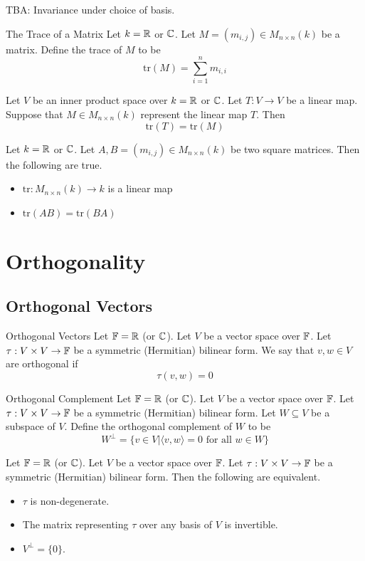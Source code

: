 \documentclass[a4paper]{article}
\begin{document}
TBA: Invariance under choice of basis. 

\begin{defn}{The Trace of a Matrix}{} Let $k=\mathbb{R}$ or $\mathbb{C}$. Let $M=(m_{i,j})\in M_{n\times n}(k)$ be a matrix. Define the trace of $M$ to be $$\text{tr}(M)=\sum_{i=1}^nm_{i,i}$$
\end{defn}

\begin{prp}{}{} Let $V$ be an inner product space over $k=\mathbb{R}$ or $\mathbb{C}$. Let $T:V\to V$ be a linear map. Suppose that $M\in M_{n\times n}(k)$ represent the linear map $T$. Then $$\text{tr}(T)=\text{tr}(M)$$
\end{prp}

\begin{lmm}{}{} Let $k=\mathbb{R}$ or $\mathbb{C}$. Let $A,B=(m_{i,j})\in M_{n\times n}(k)$ be two square matrices. Then the following are true. 
\begin{itemize}
\item $\text{tr}:M_{n\times n}(k)\to k$ is a linear map
\item $\text{tr}(AB)=\text{tr}(BA)$
\end{itemize}
\end{lmm}

\pagebreak
\section{Orthogonality}
\subsection{Orthogonal Vectors}
\begin{defn}{Orthogonal Vectors}{} Let $\mathbb{F}=\mathbb{R}$ (or $\mathbb{C}$). Let $V$ be a vector space over $\mathbb{F}$. Let $\tau:V\times V\to\mathbb{F}$ be a symmetric (Hermitian) bilinear form. We say that $v,w\in V$ are orthogonal if $$\tau(v,w)=0$$
\end{defn}

\begin{defn}{Orthogonal Complement}{} Let $\mathbb{F}=\mathbb{R}$ (or $\mathbb{C}$). Let $V$ be a vector space over $\mathbb{F}$. Let $\tau:V\times V\to\mathbb{F}$ be a symmetric (Hermitian) bilinear form. Let $W\subseteq V$ be a subspace of $V$. Define the orthogonal complement of $W$ to be $$W^{\perp}=\{v\in V|\langle v,w\rangle=0\text{ for all }w\in W\}$$
\end{defn}

\begin{prp}{}{} Let $\mathbb{F}=\mathbb{R}$ (or $\mathbb{C}$). Let $V$ be a vector space over $\mathbb{F}$. Let $\tau:V\times V\to\mathbb{F}$ be a symmetric (Hermitian) bilinear form. Then the following are equivalent. 
\begin{itemize}
\item $\tau$ is non-degenerate. 
\item The matrix representing $\tau$ over any basis of $V$ is invertible. 
\item $V^\perp=\{0\}$. 
\end{itemize}
\end{prp}
\end{document}
